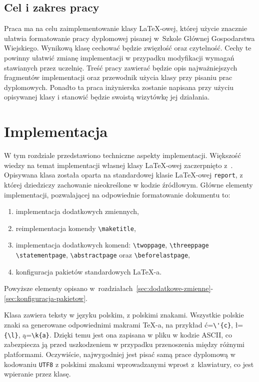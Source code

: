 \documentclass{SGGW-thesis}
\begin{document}
\section{Cel i zakres pracy}
Praca ma na celu zaimplementowanie klasy \LaTeX-owej, której użycie znacznie ułatwia formatowanie pracy dyplomowej pisanej w~Szkole Głównej Gospodarstwa Wiejskiego. Wynikową klasę cechować będzie zwięzłość oraz czytelność. Cechy te powinny ułatwić zmianę implementacji w przypadku modyfikacji wymagań stawianych przez uczelnię. Treść pracy zawierać będzie opis najważniejszych fragmentów implementacji oraz przewodnik użycia klasy przy pisaniu prac dyplomowych. Ponadto ta praca inżynierska zostanie napisana przy użyciu opisywanej klasy i stanowić będzie swoistą wizytówkę jej działania.


\chapter{Implementacja}
W tym rozdziale przedstawiono techniczne aspekty implementacji. Większość wiedzy na temat implementacji własnej klasy \LaTeX-owej zaczerpnięto z~\cite{latexclass}. Opisywana klasa została oparta na standardowej klasie \LaTeX-owej \verb|report|, z której dziedziczy zachowanie nieokreślone w kodzie źródłowym. Główne elementy implementacji, pozwalającej na odpowiednie formatowanie dokumentu to:
\begin{enumerate} [label=\alph*.]
\item{implementacja dodatkowych zmiennych,}
\item{reimplementacja komendy \verb|\maketitle|,}
\item{implementacja dodatkowych komend: \verb|\twoppage|, \verb|\threeppage|
\verb|\statementpage|, \verb|\abstractpage| oraz \verb|\beforelastpage|,}
\item{konfiguracja pakietów standardowych \LaTeX-a.}
\end{enumerate}
Powyższe elementy opisano w~rozdziałach~\ref{sec:dodatkowe-zmienne}-\ref{sec:konfiguracja-pakietow}.

Klasa zawiera teksty w języku polskim, z polskimi znakami. Wszystkie polskie znaki sa generowane odpowiednimi makrami \TeX-a, na przykład  ć=\verb|\'{c}|, ł=\verb|{\l}|, ą=\verb|\k{a}|. Dzięki temu jest ona zapisana w pliku w kodzie ASCII, co zabezpiecza ją przed uszkodzeniem w przypadku przenoszenia między różnymi platformami. Oczywiście, najwygodniej jest pisać samą prace dyplomową w kodowaniu {\tt UTF8} z polskimi znakami wprowadzanymi wprost z~klawiatury, co jest wpieranie przez klasę.
\end{document}
